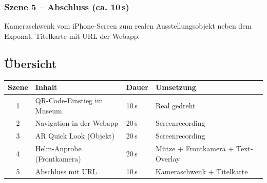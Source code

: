 \documentclass[11pt,a4paper]{article}
\begin{document}
\subsubsection*{Szene 5 -- Abschluss (ca. 10\,s)}

Kameraschwenk vom iPhone-Screen zum realen Ausstellungsobjekt neben dem Exponat. Titelkarte mit URL der Webapp.

\subsection*{Übersicht}

\begin{center}
\begin{tabular}{clll}
\toprule
\textbf{Szene} & \textbf{Inhalt} & \textbf{Dauer} & \textbf{Umsetzung} \\
\midrule
1 & QR-Code-Einstieg im Museum   & 10\,s & Real gedreht \\
2 & Navigation in der Webapp     & 20\,s & Screenrecording \\
3 & AR Quick Look (Objekt)       & 20\,s & Screenrecording \\
4 & Helm-Anprobe (Frontkamera)   & 20\,s & Mütze + Frontkamera + Text-Overlay \\
5 & Abschluss mit URL            & 10\,s & Kameraschwenk + Titelkarte \\
\bottomrule
\end{tabular}
\end{center}
\end{document}
